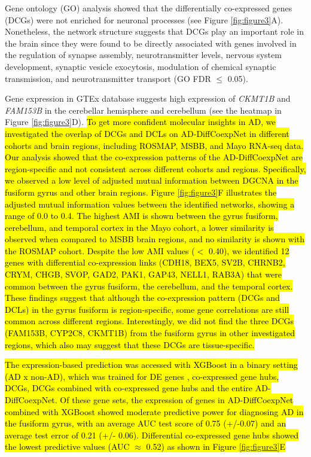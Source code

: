 \documentclass[utf8]{FrontiersinHarvard} %
\begin{document}
Gene ontology (GO) analysis showed that the differentially co-expressed genes (DCGs) were not enriched for neuronal processes (see Figure \ref{fig:figure3}A). Nonetheless, the network structure suggests that DCGs play an important role in the brain since they were found to be directly associated with genes involved in the regulation of synapse assembly, neurotransmitter levels, nervous system development, synaptic vesicle exocytosis, modulation of chemical synaptic transmission, and neurotransmitter transport (GO FDR $\leq$ 0.05).

Gene expression in GTEx database suggests high expression of \textit{CKMT1B} and \textit{FAM153B} in the cerebellar hemisphere and cerebellum (see the heatmap in Figure \ref{fig:figure3}D). \hl{To get more confident molecular insights in AD, we investigated the overlap of DCGs and DCLs on AD-DiffCoexpNet in different cohorts and brain regions, including ROSMAP, MSBB, and Mayo RNA-seq data. Our analysis showed that the co-expression patterns of the AD-DiffCoexpNet are region-specific and not consistent across different cohorts and regions. Specifically, we observed a low level of adjusted mutual information between DGCNA in the fusiform gyrus and other brain regions. Figure \ref{fig:figure3}F illustrates the adjusted mutual information values between the identified networks, showing a range of 0.0 to 0.4. The highest AMI is shown between the gyrus fusiform, cerebellum, and temporal cortex in the Mayo cohort, a lower similarity is observed when compared to MSBB brain regions, and no similarity is shown with the ROSMAP cohort. Despite the low AMI values ($<$ 0.40), we identified 12 genes with differential co-expression links (CDH18, BEX5, SV2B, CHRNB2, CRYM, CHGB, SVOP, GAD2, PAK1, GAP43, NELL1, RAB3A) that were common between the gyrus fusiform, the cerebellum, and the temporal cortex. These findings suggest that although the co-expression pattern (DCGs and DCLs) in the gyrus fusiform is region-specific, some gene correlations are still common across different regions. Interestingly, we did not find the three DCGs (FAM153B, CYP2C8, CKMT1B) from the fusiform gyrus in other investigated regions, which also may suggest that these DCGs are tissue-specific.}

\hl{ The expression-based prediction was accessed with XGBoost in a binary setting (AD x non-AD), which was trained for DE genes \citep{cavalcante2022mitochondrial}, co-expressed gene hubs, DCGs, DCGs combined with co-expressed gene hubs and the entire AD-DiffCoexpNet. Of these gene sets, the expression of genes in AD-DiffCoexpNet combined with XGBoost showed moderate predictive power for diagnosing AD in the fusiform gyrus, with an average AUC test score of 0.75 (+/-0.07) and an average test error of 0.21 (+/- 0.06). Differential co-expressed gene hubs showed the lowest predictive values (AUC $\approx$ 0.52) as shown in Figure \ref{fig:figure3}E}
\end{document}
